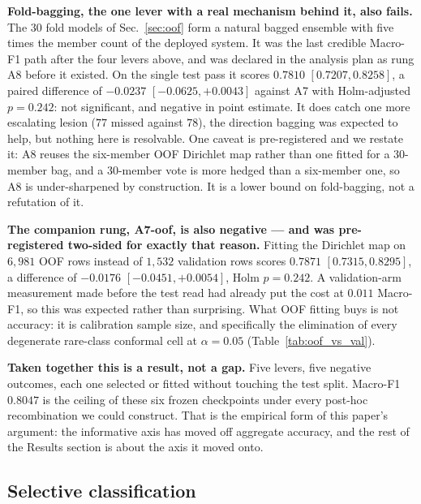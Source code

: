 \documentclass[journal]{IEEEtran}
\begin{document}
\textbf{Fold-bagging, the one lever with a real mechanism behind it, also fails.} The $30$
fold models of Sec.~\ref{sec:oof} form a natural bagged ensemble with five times the member
count of the deployed system. It was the last credible Macro-F1 path after the four levers
above, and was declared in the analysis plan as rung A8 before it existed. On the single test
pass it scores $0.7810$ $[0.7207, 0.8258]$, a paired difference of $-0.0237$
$[-0.0625, +0.0043]$ against A7 with Holm-adjusted $p=0.242$: not significant, and negative in
point estimate. It does catch one more escalating lesion ($77$ missed against $78$), the
direction bagging was expected to help, but nothing here is resolvable. One caveat is
pre-registered and we restate it: A8 reuses the six-member OOF Dirichlet map rather than one
fitted for a $30$-member bag, and a $30$-member vote is more hedged than a six-member one, so
A8 is under-sharpened by construction. It is a lower bound on fold-bagging, not a refutation
of it.

\textbf{The companion rung, A7-oof, is also negative --- and was pre-registered two-sided for
exactly that reason.} Fitting the Dirichlet map on $6{,}981$ OOF rows instead of $1{,}532$
validation rows scores $0.7871$ $[0.7315, 0.8295]$, a difference of $-0.0176$ $[-0.0451,
+0.0054]$, Holm $p=0.242$. A validation-arm measurement made before the test read had
already put the cost at $0.011$ Macro-F1, so this was expected rather than surprising. What
OOF fitting buys is not accuracy: it is calibration sample size, and specifically the
elimination of every degenerate rare-class conformal cell at $\alpha=0.05$
(Table~\ref{tab:oof_vs_val}).



\textbf{Taken together this is a result, not a gap.} Five levers, five negative outcomes, each
one selected or fitted without touching the test split. Macro-F1 $0.8047$ is the ceiling of
these six frozen checkpoints under every post-hoc recombination we could construct. That is
the empirical form of this paper's argument: the informative axis has moved off aggregate
accuracy, and the rest of the Results section is about the axis it moved onto.

\subsection{Selective classification}
\label{sec:results-selective}
\end{document}

